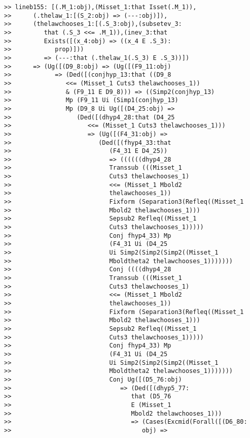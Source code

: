 \documentclass[12pt]{article}
\begin{document}
\begin{verbatim}
>> lineb155: [(.M_1:obj),(Misset_1:that Isset(.M_1)),
>>      (.thelaw_1:[(S_2:obj) => (---:obj)]),
>>      (thelawchooses_1:[(.S_3:obj),(subsetev_3:
>>         that (.S_3 <<= .M_1)),(inev_3:that
>>         Exists([(x_4:obj) => ((x_4 E .S_3):
>>            prop)]))
>>         => (---:that (.thelaw_1(.S_3) E .S_3))])
>>      => (Ug([(D9_8:obj) => (Ug([(F9_11:obj)
>>            => (Ded([(conjhyp_13:that ((D9_8
>>               <<= (Misset_1 Cuts3 thelawchooses_1))
>>               & (F9_11 E D9_8))) => ((Simp2(conjhyp_13)
>>               Mp (F9_11 Ui (Simp1(conjhyp_13)
>>               Mp (D9_8 Ui Ug([(D4_25:obj) =>
>>                  (Ded([(dhyp4_28:that (D4_25
>>                     <<= (Misset_1 Cuts3 thelawchooses_1)))
>>                     => (Ug([(F4_31:obj) =>
>>                        (Ded([(fhyp4_33:that
>>                           (F4_31 E D4_25))
>>                           => ((((((dhyp4_28
>>                           Transsub (((Misset_1
>>                           Cuts3 thelawchooses_1)
>>                           <<= (Misset_1 Mbold2
>>                           thelawchooses_1))
>>                           Fixform (Separation3(Refleq((Misset_1
>>                           Mbold2 thelawchooses_1)))
>>                           Sepsub2 Refleq((Misset_1
>>                           Cuts3 thelawchooses_1)))))
>>                           Conj fhyp4_33) Mp
>>                           (F4_31 Ui (D4_25
>>                           Ui Simp2(Simp2(Simp2((Misset_1
>>                           Mboldtheta2 thelawchooses_1)))))))
>>                           Conj ((((dhyp4_28
>>                           Transsub (((Misset_1
>>                           Cuts3 thelawchooses_1)
>>                           <<= (Misset_1 Mbold2
>>                           thelawchooses_1))
>>                           Fixform (Separation3(Refleq((Misset_1
>>                           Mbold2 thelawchooses_1)))
>>                           Sepsub2 Refleq((Misset_1
>>                           Cuts3 thelawchooses_1)))))
>>                           Conj fhyp4_33) Mp
>>                           (F4_31 Ui (D4_25
>>                           Ui Simp2(Simp2(Simp2((Misset_1
>>                           Mboldtheta2 thelawchooses_1)))))))
>>                           Conj Ug([(D5_76:obj)
>>                              => (Ded([(dhyp5_77:
>>                                 that (D5_76
>>                                 E (Misset_1
>>                                 Mbold2 thelawchooses_1)))
>>                                 => (Cases(Excmid(Forall([(D6_80:
>>                                    obj) =>

\end{verbatim}
\end{document}

